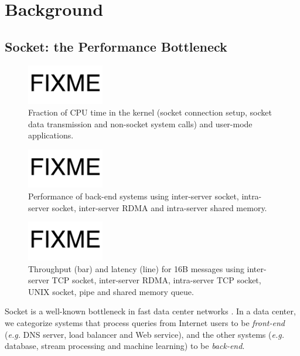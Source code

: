 \section{Background}
\label{sec:background}

\subsection{Socket: the Performance Bottleneck}
\label{subsec:bottleneck}

\begin{figure}[t]
	\centering
	\includegraphics[width=0.3\textwidth]{images/fixme}
	\caption{Fraction of CPU time in the kernel (socket connection setup, socket data transmission and non-socket system calls) and user-mode applications.}
	\label{fig:socket-kernel-time}
\end{figure}

\begin{figure}[t]
	\centering
	\includegraphics[width=0.3\textwidth]{images/fixme}
	\caption{Performance of back-end systems using inter-server socket, intra-server socket, inter-server RDMA and intra-server shared memory.}
	\label{fig:backend-performance}
\end{figure}

\begin{figure}[t]
	\centering
	\includegraphics[width=0.3\textwidth]{images/fixme}
	\caption{Throughput (bar) and latency (line) for 16B messages using inter-server TCP socket, inter-server RDMA, intra-server TCP socket, UNIX socket, pipe and shared memory queue.}
	\label{fig:socket-comparison}
\end{figure}


Socket is a well-known bottleneck in fast data center networks . In a data center, we categorize systems that process queries from Internet users to be \textit{front-end} (\textit{e.g.} DNS server, load balancer and Web service), and the other systems (\textit{e.g.} database, stream processing and machine learning) to be \textit{back-end}.

